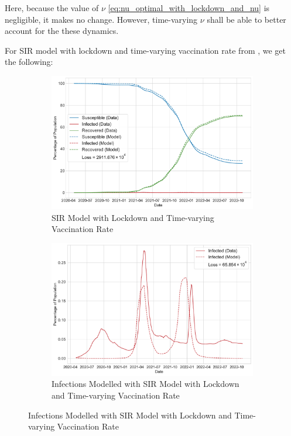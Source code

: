 \documentclass[tikz,fleqn,12pt]{wlscirep}
\begin{document}
Here, because the value of $\nu$ \cref{eq:nu_optimal_with_lockdown_and_nu} is negligible, it makes no change. However, time-varying $\nu$ shall be able to better account for the these dynamics.

For SIR model with lockdown and time-varying vaccination rate from , we get the following:
\begin{figure}[htbp!]
  \centering
  \begin{subfigure}[t]{\textwidth}
    \centering
    \includegraphics[scale=0.50]{images/SIR_model_with_lockdown_with_vaccination_time_varying_nu_IND.pdf}
    \caption{SIR Model with Lockdown and Time-varying Vaccination Rate}
    \label{fig:SIR_model_with_lockdown_with_vaccination_time_varying_nu_IND}
  \end{subfigure}

  \begin{subfigure}[t]{\textwidth}
    \centering
    \includegraphics[scale=0.50]{images/SIR_model_with_lockdown_with_vaccination_time_varying_nu_infections_IND.pdf}
    \caption{Infections Modelled with SIR Model with Lockdown and Time-varying Vaccination Rate}
    \label{fig:SIR_model_with_lockdown_with_vaccination_infections_time_varying_nu_IND}
  \end{subfigure}
\end{figure}
\end{document}
